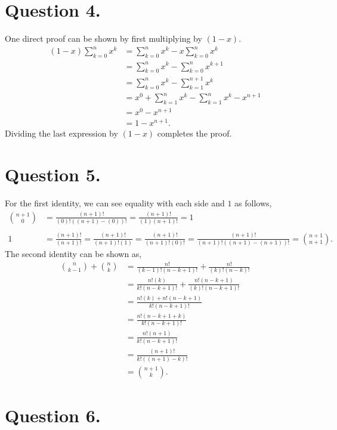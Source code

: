 \documentclass[12 pt,letterpaper]{article}
\begin{document}
\clearpage
\section*{Question 4.}
One direct proof can be shown by first multiplying by \((1-x)\).
\begin{align*}
    (1-x) \sum_{k=0}^{n}x^k
    &= \sum_{k=0}^{n}x^k - x \sum_{k=0}^{n}x^k \\
    &= \sum_{k=0}^{n}x^k - \sum_{k=0}^{n}x^{k+1} \\
    &= \sum_{k=0}^{n}x^k - \sum_{k=1}^{n+1}x^k \\
    &= x^0 + \sum_{k=1}^{n}x^k - \sum_{k=1}^{n}x^k - x^{n+1} \\
    &= x^0 - x^{n+1} \\
    &= 1 - x^{n+1}.
\end{align*}
Dividing the last expression by \((1-x)\) completes the proof.

\section*{Question 5.}

For the first identity, we can see equality with each side and \(1\) as follows,
\begin{align*}
    \binom{n+1}{0}
    &= \frac{(n+1)!}{(0)!((n+1)-(0))!}
    = \frac{(n+1)!}{(1)(n+1)!}
    = 1 \\ \\ 1
    &= \frac{(n+1)!}{(n+1)!}
    = \frac{(n+1)!}{(n+1)!(1)}
    = \frac{(n+1)!}{(n+1)!(0)!}
    = \frac{(n+1)!}{(n+1)!((n+1)-(n+1))!}
    = \binom{n+1}{n+1}.
\end{align*}
The second identity can be shown as,
\begin{align*}
    \binom{n}{k-1} + \binom{n}{k}
    &= \frac{n!}{(k-1)!(n-k+1)!} + \frac{n!}{(k)!(n-k)!} \\
    &= \frac{n!(k)}{k!(n-k+1)!} + \frac{n!(n-k+1)}{(k)!(n-k+1)!} \\
    &= \frac{n!(k)+ n!(n-k+1)}{k!(n-k+1)!} \\
    &= \frac{n!(n-k+1+k)}{k!(n-k+1)!} \\
    &= \frac{n!(n+1)}{k!(n-k+1)!} \\
    &= \frac{(n+1)!}{k!((n+1)-k)!} \\
    &= \binom{n+1}{k}.
\end{align*}

\clearpage
\section*{Question 6.}
\end{document}
